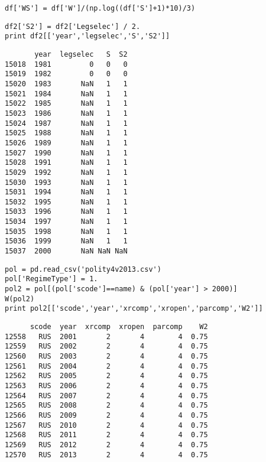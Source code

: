 \documentclass[12pt,fleqn]{article}\usepackage{common}
\begin{document}

\begin{verbatim}
df['WS'] = df['W']/(np.log((df['S']+1)*10)/3)
\end{verbatim}


\begin{verbatim}
df2['S2'] = df2['Legselec'] / 2.
print df2[['year','legselec','S','S2']]
\end{verbatim}

\begin{verbatim}
       year  legselec   S  S2
15018  1981         0   0   0
15019  1982         0   0   0
15020  1983       NaN   1   1
15021  1984       NaN   1   1
15022  1985       NaN   1   1
15023  1986       NaN   1   1
15024  1987       NaN   1   1
15025  1988       NaN   1   1
15026  1989       NaN   1   1
15027  1990       NaN   1   1
15028  1991       NaN   1   1
15029  1992       NaN   1   1
15030  1993       NaN   1   1
15031  1994       NaN   1   1
15032  1995       NaN   1   1
15033  1996       NaN   1   1
15034  1997       NaN   1   1
15035  1998       NaN   1   1
15036  1999       NaN   1   1
15037  2000       NaN NaN NaN
\end{verbatim}

\begin{verbatim}
pol = pd.read_csv('polity4v2013.csv')
pol['RegimeType'] = 1.
pol2 = pol[(pol['scode']==name) & (pol['year'] > 2000)]
W(pol2)
print pol2[['scode','year','xrcomp','xropen','parcomp','W2']]
\end{verbatim}

\begin{verbatim}
      scode  year  xrcomp  xropen  parcomp    W2
12558   RUS  2001       2       4        4  0.75
12559   RUS  2002       2       4        4  0.75
12560   RUS  2003       2       4        4  0.75
12561   RUS  2004       2       4        4  0.75
12562   RUS  2005       2       4        4  0.75
12563   RUS  2006       2       4        4  0.75
12564   RUS  2007       2       4        4  0.75
12565   RUS  2008       2       4        4  0.75
12566   RUS  2009       2       4        4  0.75
12567   RUS  2010       2       4        4  0.75
12568   RUS  2011       2       4        4  0.75
12569   RUS  2012       2       4        4  0.75
12570   RUS  2013       2       4        4  0.75
\end{verbatim}
\end{document}
